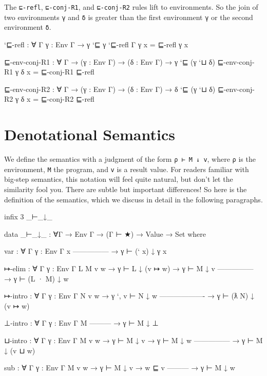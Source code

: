 The \texttt{⊑-refl}, \texttt{⊑-conj-R1}, and \texttt{⊑-conj-R2} rules
lift to environments. So the join of two environments \texttt{γ} and
\texttt{δ} is greater than the first environment \texttt{γ} or the
second environment \texttt{δ}.

\begin{fence}
\begin{code}
`⊑-refl : ∀ {Γ} {γ : Env Γ} → γ `⊑ γ
`⊑-refl {Γ} {γ} x = ⊑-refl {γ x}

⊑-env-conj-R1 : ∀ {Γ} → (γ : Env Γ) → (δ : Env Γ) → γ `⊑ (γ `⊔ δ)
⊑-env-conj-R1 γ δ x = ⊑-conj-R1 ⊑-refl

⊑-env-conj-R2 : ∀ {Γ} → (γ : Env Γ) → (δ : Env Γ) → δ `⊑ (γ `⊔ δ)
⊑-env-conj-R2 γ δ x = ⊑-conj-R2 ⊑-refl
\end{code}
\end{fence}

\hypertarget{denotational-semantics}{%
\section{Denotational Semantics}\label{denotational-semantics}}

We define the semantics with a judgment of the form
\texttt{ρ\ ⊢\ M\ ↓\ v}, where \texttt{ρ} is the environment, \texttt{M}
the program, and \texttt{v} is a result value. For readers familiar with
big-step semantics, this notation will feel quite natural, but don't let
the similarity fool you. There are subtle but important differences! So
here is the definition of the semantics, which we discuss in detail in
the following paragraphs.

\begin{fence}
\begin{code}
infix 3 _⊢_↓_

data _⊢_↓_ : ∀{Γ} → Env Γ → (Γ ⊢ ★) → Value → Set where

  var : ∀ {Γ} {γ : Env Γ} {x}
      ---------------
    → γ ⊢ (` x) ↓ γ x

  ↦-elim : ∀ {Γ} {γ : Env Γ} {L M v w}
    → γ ⊢ L ↓ (v ↦ w)
    → γ ⊢ M ↓ v
      ---------------
    → γ ⊢ (L · M) ↓ w

  ↦-intro : ∀ {Γ} {γ : Env Γ} {N v w}
    → γ `, v ⊢ N ↓ w
      -------------------
    → γ ⊢ (ƛ N) ↓ (v ↦ w)

  ⊥-intro : ∀ {Γ} {γ : Env Γ} {M}
      ---------
    → γ ⊢ M ↓ ⊥

  ⊔-intro : ∀ {Γ} {γ : Env Γ} {M v w}
    → γ ⊢ M ↓ v
    → γ ⊢ M ↓ w
      ---------------
    → γ ⊢ M ↓ (v ⊔ w)

  sub : ∀ {Γ} {γ : Env Γ} {M v w}
    → γ ⊢ M ↓ v
    → w ⊑ v
      ---------
    → γ ⊢ M ↓ w
\end{code}
\end{fence}

